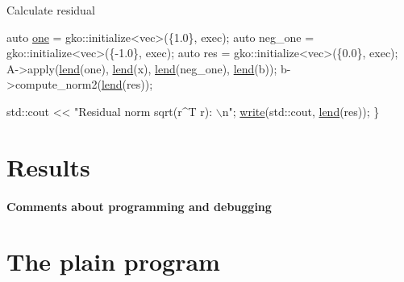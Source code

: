 Calculate residual


\begin{DoxyCode}
    \textcolor{keyword}{auto} \hyperlink{namespacegko_a0059e27f8f4bc348ff65c1e60caf47c8}{one} = gko::initialize<vec>(\{1.0\}, exec);
    \textcolor{keyword}{auto} neg\_one = gko::initialize<vec>(\{-1.0\}, exec);
    \textcolor{keyword}{auto} res = gko::initialize<vec>(\{0.0\}, exec);
    A->apply(\hyperlink{namespacegko_aa8cb4876b72e5e1036ea9575443c439b}{lend}(one), \hyperlink{namespacegko_aa8cb4876b72e5e1036ea9575443c439b}{lend}(x), \hyperlink{namespacegko_aa8cb4876b72e5e1036ea9575443c439b}{lend}(neg\_one), \hyperlink{namespacegko_aa8cb4876b72e5e1036ea9575443c439b}{lend}(b));
    b->compute\_norm2(\hyperlink{namespacegko_aa8cb4876b72e5e1036ea9575443c439b}{lend}(res));

    std::cout << \textcolor{stringliteral}{"Residual norm sqrt(r^T r): \(\backslash\)n"};
    \hyperlink{namespacegko_a859dc47a462721d83728d91ab7fa2148}{write}(std::cout, \hyperlink{namespacegko_aa8cb4876b72e5e1036ea9575443c439b}{lend}(res));
\}
\end{DoxyCode}
 \label{_Results}%
\section*{Results}

\label{_Commentsaboutprogramminganddebugging}%
\paragraph*{Comments about programming and debugging }

\label{_PlainProg}%
 \section*{The plain program}


\begin{DoxyCodeInclude}
\end{DoxyCodeInclude}
 